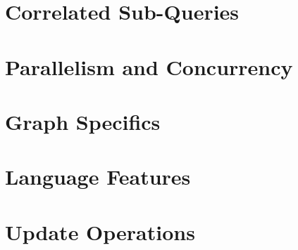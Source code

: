 \section{Correlated Sub-Queries}






\section{Parallelism and Concurrency}






\section{Graph Specifics}













\section{Language Features}












\section{Update Operations}





